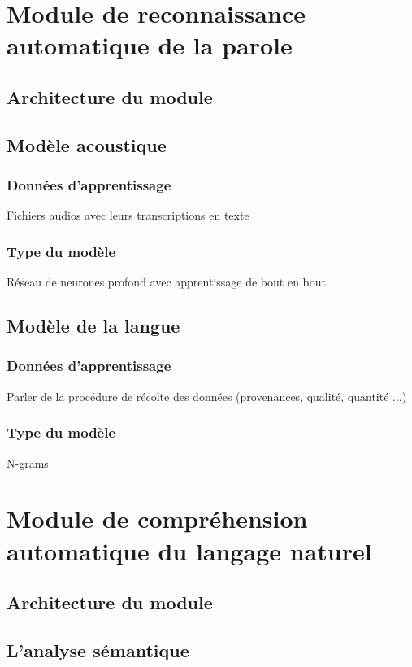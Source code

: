 \section{Module de reconnaissance automatique de la parole}
	\subsection{Architecture du module}
	\subsection{Modèle acoustique}
		\subsubsection*{Données d'apprentissage}
		Fichiers audios avec leurs transcriptions en texte
		\subsubsection*{Type du modèle}
		Réseau de neurones profond avec apprentissage de bout en bout
	\subsection{Modèle de la langue}
		\subsubsection*{Données d'apprentissage}
		Parler de la procédure de récolte des données (provenances, qualité, quantité ...)
		\subsubsection*{Type du modèle}
		N-grams

\section{Module de compréhension automatique du langage naturel }
	\subsection{Architecture du module}
	\subsection{L'analyse sémantique}
